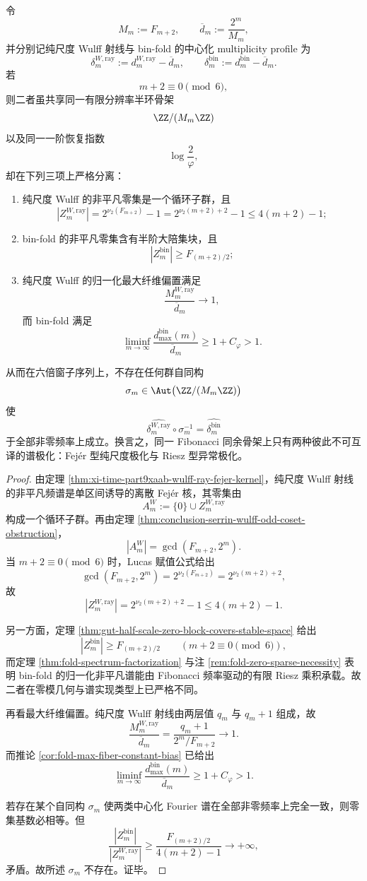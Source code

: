 \begin{theorem}\label{thm:conclusion-serrin-wulff-fibadic-fejer-riesz-polarization}
令
\[
M_m:=F_{m+2},
\qquad
\overline d_m:=\frac{2^m}{M_m},
\]
并分别记纯尺度 Wulff 射线与 bin-fold 的中心化 multiplicity profile 为
\[
\delta_m^{W,\mathrm{ray}}
:=
d_m^{W,\mathrm{ray}}-\overline d_m,
\qquad
\delta_m^{\mathrm{bin}}
:=
d_m^{\mathrm{bin}}-\overline d_m.
\]
若
\[
m+2\equiv 0\pmod 6,
\]
则二者虽共享同一有限分辨率半环骨架
\[
\ZZ/(M_m\ZZ)
\]
以及同一一阶恢复指数
\[
\log\frac{2}{\varphi},
\]
却在下列三项上严格分离：
\begin{enumerate}
  \item 纯尺度 Wulff 的非平凡零集是一个循环子群，且
  \[
  |Z_m^{W,\mathrm{ray}}|
  =
  2^{\nu_2(F_{m+2})}-1
  =
  2^{\nu_2(m+2)+2}-1
  \le 4(m+2)-1;
  \]
  \item bin-fold 的非平凡零集含有半阶大陪集块，且
  \[
  |Z_m^{\mathrm{bin}}|\ge F_{(m+2)/2};
  \]
  \item 纯尺度 Wulff 的归一化最大纤维偏置满足
  \[
  \frac{M_m^{W,\mathrm{ray}}}{\overline d_m}\to 1,
  \]
  而 bin-fold 满足
  \[
  \liminf_{m\to\infty}\frac{d_{\max}^{\mathrm{bin}}(m)}{\overline d_m}\ge 1+C_\varphi>1.
  \]
\end{enumerate}
从而在六倍窗子序列上，不存在任何群自同构
\[
\sigma_m\in \Aut\bigl(\ZZ/(M_m\ZZ)\bigr)
\]
使
\[
\widehat{\delta_m^{W,\mathrm{ray}}}\circ \sigma_m^{-1}
=
\widehat{\delta_m^{\mathrm{bin}}}
\]
于全部非零频率上成立。换言之，同一 Fibonacci 同余骨架上只有两种彼此不可互译的谱极化：Fej\'er 型纯尺度极化与 Riesz 型异常极化。
\end{theorem}
\begin{proof}
由定理 \ref{thm:xi-time-part9xaab-wulff-ray-fejer-kernel}，纯尺度 Wulff 射线的非平凡频谱是单区间诱导的离散 Fej\'er 核，其零集由
\[
A_m^{W}:=\{0\}\cup Z_m^{W,\mathrm{ray}}
\]
构成一个循环子群。再由定理 \ref{thm:conclusion-serrin-wulff-odd-coset-obstruction}，
\[
|A_m^W|=\gcd(F_{m+2},2^m).
\]
当 \(m+2\equiv 0\pmod 6\) 时，Lucas 赋值公式给出
\[
\gcd(F_{m+2},2^m)=2^{\nu_2(F_{m+2})}=2^{\nu_2(m+2)+2},
\]
故
\[
|Z_m^{W,\mathrm{ray}}|
=
2^{\nu_2(m+2)+2}-1
\le 4(m+2)-1.
\]

另一方面，定理 \ref{thm:gut-half-scale-zero-block-covers-stable-space} 给出
\[
|Z_m^{\mathrm{bin}}|\ge F_{(m+2)/2}
\qquad (m+2\equiv 0\!\!\!\pmod 6),
\]
而定理 \ref{thm:fold-spectrum-factorization} 与注 \ref{rem:fold-zero-sparse-necessity} 表明 bin-fold 的归一化非平凡谱能由 Fibonacci 频率驱动的有限 Riesz 乘积承载。故二者在零模几何与谱实现类型上已严格不同。

再看最大纤维偏置。纯尺度 Wulff 射线由两层值 \(q_m\) 与 \(q_m+1\) 组成，故
\[
\frac{M_m^{W,\mathrm{ray}}}{\overline d_m}
=
\frac{q_m+1}{2^m/F_{m+2}}
\longrightarrow 1.
\]
而推论 \ref{cor:fold-max-fiber-constant-bias} 已给出
\[
\liminf_{m\to\infty}\frac{d_{\max}^{\mathrm{bin}}(m)}{\overline d_m}\ge 1+C_\varphi>1.
\]

若存在某个自同构 \(\sigma_m\) 使两类中心化 Fourier 谱在全部非零频率上完全一致，则零集基数必相等。但
\[
\frac{|Z_m^{\mathrm{bin}}|}{|Z_m^{W,\mathrm{ray}}|}
\ge
\frac{F_{(m+2)/2}}{4(m+2)-1}
\longrightarrow +\infty,
\]
矛盾。故所述 \(\sigma_m\) 不存在。证毕。
\end{proof}

